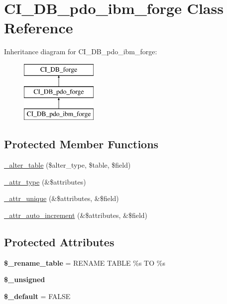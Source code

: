 \hypertarget{class_c_i___d_b__pdo__ibm__forge}{}\section{C\+I\+\_\+\+D\+B\+\_\+pdo\+\_\+ibm\+\_\+forge Class Reference}
\label{class_c_i___d_b__pdo__ibm__forge}
Inheritance diagram for C\+I\+\_\+\+D\+B\+\_\+pdo\+\_\+ibm\+\_\+forge\+:\begin{figure}[H]
\begin{center}
\leavevmode
\includegraphics[height=3.000000cm]{class_c_i___d_b__pdo__ibm__forge}
\end{center}
\end{figure}
\subsection*{Protected Member Functions}
\begin{DoxyCompactItemize}
\item 
\mbox{\hyperlink{class_c_i___d_b__pdo__ibm__forge_adbe6620c08b0b5cb60ed2d923b473a93}{\+\_\+alter\+\_\+table}} (\$alter\+\_\+type, \$table, \$field)
\item 
\mbox{\hyperlink{class_c_i___d_b__pdo__ibm__forge_a750f046906f2a0fdd474b0fe9de9952b}{\+\_\+attr\+\_\+type}} (\&\$attributes)
\item 
\mbox{\hyperlink{class_c_i___d_b__pdo__ibm__forge_a6fa6a11e8cbe15b01c800a161cc59933}{\+\_\+attr\+\_\+unique}} (\&\$attributes, \&\$field)
\item 
\mbox{\hyperlink{class_c_i___d_b__pdo__ibm__forge_a0319dbacc23d0e5190bee7a12be1fff1}{\+\_\+attr\+\_\+auto\+\_\+increment}} (\&\$attributes, \&\$field)
\end{DoxyCompactItemize}
\subsection*{Protected Attributes}
\begin{DoxyCompactItemize}
\item 
\mbox{\label{class_c_i___d_b__pdo__ibm__forge_a29f2831127a41489d0bce63cce8e9855}} 
{\bfseries \$\+\_\+rename\+\_\+table} = \textquotesingle{}R\+E\+N\+A\+ME T\+A\+B\+LE \%s TO \%s\textquotesingle{}
\item 
{\bfseries \$\+\_\+unsigned}
\item 
\mbox{\label{class_c_i___d_b__pdo__ibm__forge_a041287ac6e25827c28a53b71bb491711}} 
{\bfseries \$\+\_\+default} = F\+A\+L\+SE
\end{DoxyCompactItemize}
